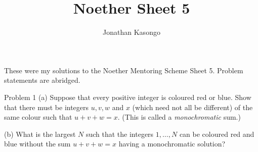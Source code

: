 \documentclass{article}
\author{Jonathan Kasongo}
\title{Noether Sheet 5}
\begin{document}
\maketitle
\centerline{
These were my solutions to the Noether Mentoring Scheme Sheet 5. Problem
statements are abridged.
}

\begin{problem}{Problem 1}
(a) Suppose that every positive integer is coloured red or blue. Show that
there must be integers $u,v, w$ and $x$ (which need not all be different)
of the same colour such that $u + v + w = x$. (This is called a
\textit{monochromatic} sum.)
\vspace{0.2cm}

(b) What is the largest $N$ such that the integers $1, \ldots, N$ can be
coloured red and blue without the sum $u+v+w=x$ having a monochromatic
solution?
\end{problem}
\end{document}
